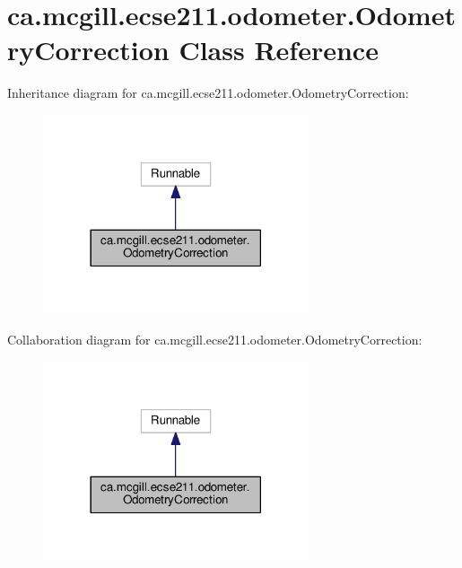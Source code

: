 \hypertarget{classca_1_1mcgill_1_1ecse211_1_1odometer_1_1_odometry_correction}{}\section{ca.\+mcgill.\+ecse211.\+odometer.\+Odometry\+Correction Class Reference}
\label{classca_1_1mcgill_1_1ecse211_1_1odometer_1_1_odometry_correction}


Inheritance diagram for ca.\+mcgill.\+ecse211.\+odometer.\+Odometry\+Correction\+:
\nopagebreak
\begin{figure}[H]
\begin{center}
\leavevmode
\includegraphics[width=222pt]{classca_1_1mcgill_1_1ecse211_1_1odometer_1_1_odometry_correction__inherit__graph}
\end{center}
\end{figure}


Collaboration diagram for ca.\+mcgill.\+ecse211.\+odometer.\+Odometry\+Correction\+:
\nopagebreak
\begin{figure}[H]
\begin{center}
\leavevmode
\includegraphics[width=222pt]{classca_1_1mcgill_1_1ecse211_1_1odometer_1_1_odometry_correction__coll__graph}
\end{center}
\end{figure}
